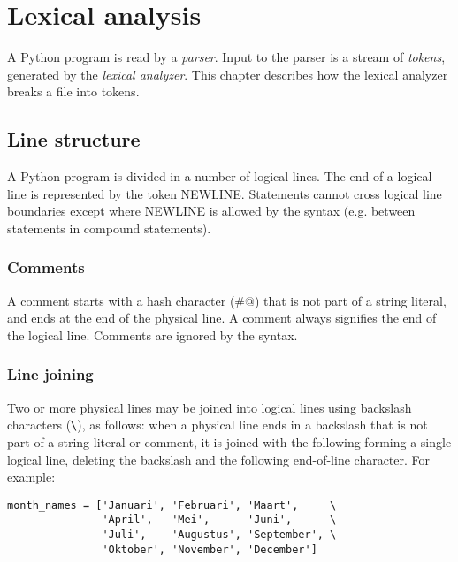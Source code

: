 \chapter{Lexical analysis}

A Python program is read by a {\em parser}.  Input to the parser is a
stream of {\em tokens}, generated by the {\em lexical analyzer}.  This
chapter describes how the lexical analyzer breaks a file into tokens.

\section{Line structure}

A Python program is divided in a number of logical lines.  The end of
a logical line is represented by the token NEWLINE.  Statements cannot
cross logical line boundaries except where NEWLINE is allowed by the
syntax (e.g. between statements in compound statements).

\subsection{Comments}

A comment starts with a hash character (\verb@#@) that is not part of
a string literal, and ends at the end of the physical line.  A comment
always signifies the end of the logical line.  Comments are ignored by
the syntax.

\subsection{Line joining}

Two or more physical lines may be joined into logical lines using
backslash characters (\verb/\/), as follows: when a physical line ends
in a backslash that is not part of a string literal or comment, it is
joined with the following forming a single logical line, deleting the
backslash and the following end-of-line character.  For example:
%
\begin{verbatim}
month_names = ['Januari', 'Februari', 'Maart',     \
               'April',   'Mei',      'Juni',      \
               'Juli',    'Augustus', 'September', \
               'Oktober', 'November', 'December']
\end{verbatim}

